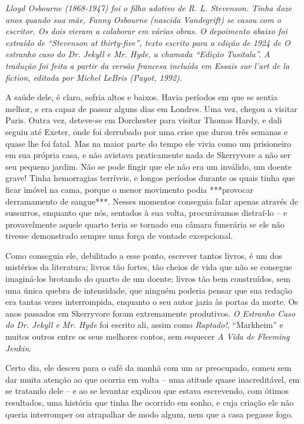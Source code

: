 {\itshape Lloyd Osbourne (1868-1947) foi o filho
adotivo de R. L. Stevenson.  Tinha doze anos quando sua mãe, Fanny
Osbourne (nascida Vandegrift) se casou com o escritor.  Os dois vieram
a colaborar em várias obras. O depoimento abaixo foi extraído de
“Stevenson at thirty-five”, texto escrito para a edição de 1924 de
\emph{O estranho caso do Dr. Jekyll e Mr. Hyde}, a chamada “Edição Tusitala”. A tradução foi feita a
partir da versão francesa incluída em \emph{Essais sur l’art de la fiction},
editada por Michel LeBris (Payot, 1992).}

\clearpage

A saúde dele, é claro, sofria altos e baixos.  Havia períodos em que se
sentia melhor, e era capaz de passar alguns dias em Londres.  Uma vez,
chegou a visitar Paris.  Outra vez, deteve-se em Dorchester para
visitar Thomas Hardy, e dali seguiu até Exeter, onde foi derrubado por
uma crise que durou três semanas e quase lhe foi fatal.  Mas na maior
parte do tempo ele vivia como um prisioneiro em sua própria casa, e não
avistava praticamente nada de Skerryvore a não ser seu pequeno jardim. 
Não se pode fingir que ele não era um inválido, um doente grave!  Tinha
hemorragias terríveis, e longos períodos durante os quais tinha que
ficar imóvel na cama, porque o menor movimento podia ***provocar		%
derramamento de sangue***.  Nesses momentos conseguia falar apenas
através de sussurros, enquanto que nós, sentados à sua volta,
procurávamos distraí-lo -- e provavelmente aquele quarto teria se
tornado sua câmara funerária se ele não tivesse demonstrado sempre uma
força de vontade excepcional.

Como conseguia ele, debilitado a esse ponto, escrever tantos livros, é
um dos mistérios da literatura; livros tão fortes, tão cheios de vida
que não se consegue imaginá-los brotando do quarto de um doente; livros
tão bem construídos, sem uma única quebra de intensidade, que ninguém
poderia pensar que sua redação era tantas vezes interrompida, enquanto
o seu autor jazia às portas da morte.  Os anos passados em Skerryvore
foram extremamente produtivos.  \textit{O Estranho Caso do Dr. Jekyll e
Mr. Hyde} foi escrito ali, assim como \textit{Raptado!}, “Markheim” e
muitos outros entre os seus melhores contos, sem esquecer \textit{A
Vida de Fleeming Jenkin}. 

Certo dia, ele desceu para o café da manhã com um ar preocupado, comeu
sem dar muita atenção ao que ocorria em volta -- uma atitude quase
inacreditável, em se tratando dele -- e ao se levantar explicou que
estava escrevendo, com ótimos resultados, uma história que tinha lhe
ocorrido em sonho, e cuja criação ele não queria interromper ou
atrapalhar de modo algum, nem que a casa pegasse fogo.

